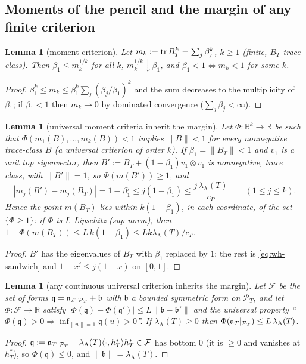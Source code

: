 \documentclass[11pt]{amsart}
\newtheorem{lemma}[theorem]{Lemma}
\theoremstyle{definition}
\theoremstyle{remark}
\newcommand{\R}{\mathbb R}
\newcommand{\PT}{\mathcal P_T}
\begin{document}
\subsection{Moments of the pencil and the margin of any finite criterion}\label{subsec:wh-moments}

\begin{lemma}[moment criterion]\label{lem:wh-mom}
Let $m_k:=\operatorname{tr} B_T^k=\sum_j\beta_j^k$, $k\ge1$ (finite, $B_T$ trace class). Then $\beta_1\le m_k^{1/k}$ for all $k$, $m_k^{1/k}\downarrow\beta_1$,
and $\beta_1<1\iff m_k<1$ for some $k$.
\end{lemma}
\begin{proof}
$\beta_1^k\le m_k\le\beta_1^k\sum_j(\beta_j/\beta_1)^k$ and the sum decreases to the multiplicity of $\beta_1$; if $\beta_1<1$ then
$m_k\to0$ by dominated convergence ($\sum_j\beta_j<\infty$).
\end{proof}

\begin{lemma}[universal moment criteria inherit the margin]\label{lem:wh-T}
Let $\Phi:\R^k\to\R$ be such that $\Phi(m_1(B),\dots,m_k(B))<1$ implies $\|B\|<1$ for every nonnegative trace-class $B$
(a \emph{universal} criterion of order $k$). If $\beta_1=\|B_T\|<1$ and $v_1$ is a unit top eigenvector, then
$B':=B_T+(1-\beta_1)v_1\otimes v_1$ is nonnegative, trace class, with $\|B'\|=1$, so $\Phi(m(B'))\ge1$, and
\[
|m_j(B')-m_j(B_T)|=1-\beta_1^j\le j(1-\beta_1)\le\frac{j\,\lambda_{\mathrm A}(T)}{c_P}\qquad(1\le j\le k).
\]
Hence the point $m(B_T)$ lies within $k(1-\beta_1)$, in each coordinate, of the set $\{\Phi\ge1\}$: if $\Phi$ is $L$-Lipschitz
(sup-norm), then $1-\Phi(m(B_T))\le L\,k(1-\beta_1)\le Lk\lambda_{\mathrm A}(T)/c_P$.
\end{lemma}
\begin{proof}
$B'$ has the eigenvalues of $B_T$ with $\beta_1$ replaced by $1$; the rest is \eqref{eq:wh-sandwich} and $1-x^j\le j(1-x)$ on $[0,1]$.
\end{proof}

\begin{lemma}[any continuous universal criterion inherits the margin]\label{lem:wh-Tprime}
Let $\mathcal F$ be the set of forms $\mathfrak q=\fa|_{\PT}+\mathfrak b$ with $\mathfrak b$ a bounded symmetric form on $\PT$, and let
$\Phi:\mathcal F\to\R$ satisfy $|\Phi(\mathfrak q)-\Phi(\mathfrak q')|\le L\|\mathfrak b-\mathfrak b'\|$ and the universal property
``$\Phi(\mathfrak q)>0\Rightarrow\inf_{\|u\|=1}\mathfrak q(u)>0$''. If $\lambda_{\mathrm A}(T)\ge0$ then $\Phi(\fa|_{\PT})\le L\,\lambda_{\mathrm A}(T)$.
\end{lemma}
\begin{proof}
$\mathfrak q:=\fa|_{\PT}-\lambda_{\mathrm A}(T)\langle\cdot,h^*_T\rangle h^*_T\in\mathcal F$ has bottom $0$ (it is $\ge0$ and vanishes at $h^*_T$),
so $\Phi(\mathfrak q)\le0$, and $\|\mathfrak b\|=\lambda_{\mathrm A}(T)$.
\end{proof}
\end{document}
